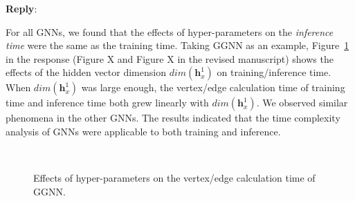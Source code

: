 \documentclass[12pt]{article}
\newcommand{\MyVec}[1]{\boldsymbol{#1}}
\newenvironment{reply}
   {\medskip \noindent \textbf{Reply}:\  }
   {\medskip}
\begin{document}
\begin{reply}
    
    For all GNNs, we found that the effects of hyper-parameters on the \emph{inference time} were the same as the training time.
    Taking GGNN as an example, Figure~\ref{fig:compare_effect_of_hyperparameter_on_time} in the response (Figure X and Figure X in the revised manuscript) shows the effects of the hidden vector dimension $dim(\MyVec{h}^1_x)$ on training/inference time.
    When $dim(\MyVec{h}^1_x)$ was large enough, the vertex/edge calculation time of training time and inference time both grew linearly with $dim(\MyVec{h}^1_x)$.
    We observed similar phenomena in the other GNNs.
    The results indicated that the time complexity analysis of GNNs were applicable to both training and inference.
        
    \begin{figure}[H]
            \centering
             \\
            \caption{Effects of hyper-parameters on the vertex/edge calculation time of GGNN.}
            \label{fig:compare_effect_of_hyperparameter_on_time}
    \end{figure}
        

\end{reply}
\end{document}
